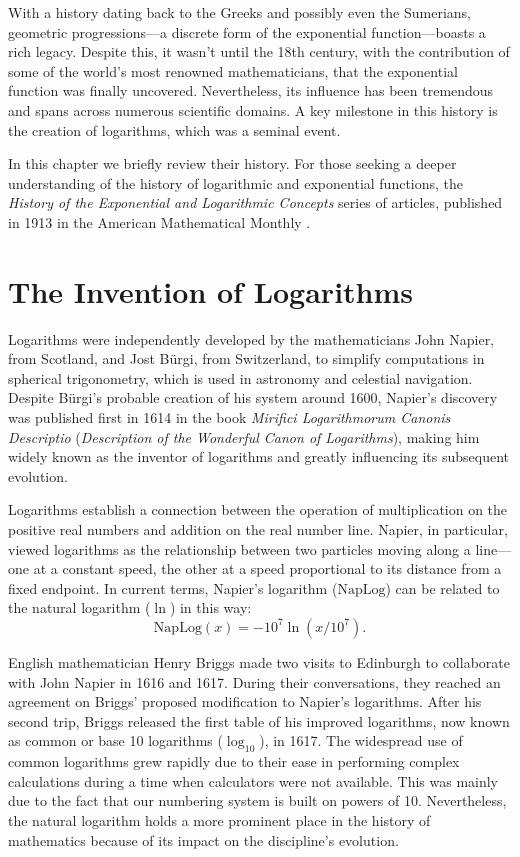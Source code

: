 With a history dating back to the Greeks and possibly even the Sumerians, geometric progressions---a discrete form of the exponential function---boasts a rich legacy. Despite this, it wasn't until the 18th century, with the contribution of some of the world's most renowned mathematicians, that the exponential function was finally uncovered. Nevertheless, its influence has been tremendous and spans across numerous scientific domains. A key milestone in this history is the creation of logarithms, which was a seminal event.

In this chapter we briefly review their history. For those seeking a deeper understanding of the history of logarithmic and exponential functions, the \emph{History of the Exponential and Logarithmic Concepts} series of articles, published in 1913 in the American Mathematical Monthly \citep{Cajori1913a,Cajori1913b,Cajori1913c,Cajori1913d,Cajori1913e,Cajori1913f,Cajori1913g}.

\section{The Invention of Logarithms}

Logarithms were independently developed by the mathematicians John Napier, from Scotland, and Jost Bürgi, from Switzerland, to simplify computations in spherical trigonometry, which is used in astronomy and celestial navigation. Despite Bürgi's probable creation of his system around 1600, Napier's discovery was published first in 1614 in the book \emph{Mirifici Logarithmorum Canonis Descriptio} (\emph{Description of the Wonderful Canon of Logarithms}), making him widely known as the inventor of logarithms and greatly influencing its subsequent evolution.

Logarithms establish a connection between the operation of multiplication on the positive real numbers and addition on the real number line. Napier, in particular, viewed logarithms as the relationship between two particles moving along a line---one at a constant speed, the other at a speed proportional to its distance from a fixed endpoint. In current terms, Napier's logarithm ($\mathrm{NapLog}$) can be related to the natural logarithm ($\ln$) in this way:
\begin{equation*}
    \mathrm{NapLog}(x) = -10^7 \ln(x / 10^7).    
\end{equation*}

English mathematician Henry Briggs made two visits to Edinburgh to collaborate with John Napier in 1616 and 1617. During their conversations, they reached an agreement on Briggs' proposed modification to Napier's logarithms. After his second trip, Briggs released the first table of his improved logarithms, now known as common or base 10 logarithms ($\log_{10}$), in 1617. The widespread use of common logarithms grew rapidly due to their ease in performing complex calculations during a time when calculators were not available. This was mainly due to the fact that our numbering system is built on powers of 10. Nevertheless, the natural logarithm holds a more prominent place in the history of mathematics because of its impact on the discipline's evolution.

